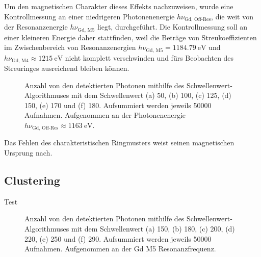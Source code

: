 \noindent
Um den magnetischen Charakter dieses Effekts nachzuweisen, wurde eine Kontrollmessung an einer niedrigeren Photonenenergie $h\nu_{\text{Gd, Off-Res}}$, die weit von der Resonanzenergie $h\nu_{\text{Gd, M5}}$ liegt, durchgeführt. Die Kontrollmessung soll an einer kleineren Energie daher stattfinden, weil die Beträge von Streukoeffizienten im Zwischenbereich von Resonanzenergien $h\nu_{\text{Gd, M5}} = \SI{1184,79}{\eV}$ und $h\nu_{\text{Gd, M4}} \approx \SI{1215}{\eV}$ nicht komplett verschwinden und fürs Beobachten des Streuringes ausreichend bleiben können.
\begin{figure}[H]
    \centering
    
    \caption{Anzahl von den detektierten Photonen mithilfe des Schwellenwert-Algorithmuses mit dem Schwellenwert (a) \SI{50}{\adu}, (b) \SI{100}{\adu}, (c) \SI{125}{\adu}, (d) \SI{150}{\adu}, (e) \SI{170}{\adu} und (f) \SI{180}{\adu}. Aufsummiert werden jeweils \num{50000} Aufnahmen. Aufgenommen an der Photonenenergie $h\nu_\text{Gd, Off-Res} \approx \SI{1163}{\eV}$.}
    \label{fig:th_50_100_125_150_170_180_off_resonance}
\end{figure}

Das Fehlen des charakteristischen Ringmusters weist seinen magnetischen Ursprung nach.





\subsection{Clustering}
\noindent
Test
\begin{figure}[H]
    \centering
    
    \caption{Anzahl von den detektierten Photonen mithilfe des Schwellenwert-Algorithmuses mit dem Schwellenwert (a) \SI{150}{\adu}, (b) \SI{180}{\adu}, (c) \SI{200}{\adu}, (d) \SI{220}{\adu}, (e) \SI{250}{\adu} und (f) \SI{290}{\adu}. Aufsummiert werden jeweils \num{50000} Aufnahmen. Aufgenommen an der Gd M5 Resonanzfrequenz.}
    \label{fig:cl_2_0_100_125_150_170_180_resonance}
\end{figure}

